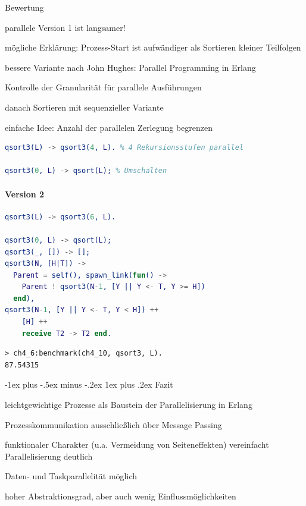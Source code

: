 \documentclass[10pt]{article}
\makeatletter
\renewcommand{\subsubsection}{\@startsection{subsubsection}{3}{0mm}%
                                {-1ex plus -.5ex minus -.2ex}%
                                {1ex plus .2ex}%
                                {\normalfont\small\bfseries}}
\makeatother
\begin{document}
Bewertung
\begin{itemize*}
  \item parallele Version 1 ist langsamer!
  \item mögliche Erklärung: Prozess-Start ist aufwändiger als Sortieren kleiner Teilfolgen
  \item bessere Variante nach John Hughes: Parallel Programming in Erlang
  \begin{itemize*}
    \item Kontrolle der Granularität für parallele Ausführungen
    \item danach Sortieren mit sequenzieller Variante
    \item einfache Idee: Anzahl der parallelen Zerlegung begrenzen
  \end{itemize*}
\end{itemize*}
\begin{lstlisting}[language=erlang]
qsort3(L) -> qsort3(4, L). % 4 Rekursionsstufen parallel

qsort3(0, L) -> qsort(L); % Umschalten
\end{lstlisting}

\paragraph{Version 2}
\begin{lstlisting}[language=erlang]
qsort3(L) -> qsort3(6, L).

qsort3(0, L) -> qsort(L);
qsort3(_, []) -> [];
qsort3(N, [H|T]) ->
  Parent = self(), spawn_link(fun() ->
    Parent ! qsort3(N-1, [Y || Y <- T, Y >= H])
  end),
qsort3(N-1, [Y || Y <- T, Y < H]) ++
    [H] ++
    receive T2 -> T2 end.  
\end{lstlisting}
\begin{lstlisting}
> ch4_6:benchmark(ch4_10, qsort3, L).
87.54315
\end{lstlisting}

\subsubsection{Fazit}
\begin{itemize*}
  \item \color{orange} leichtgewichtige Prozesse \color{black} als Baustein der Parallelisierung in Erlang
  \item Prozesskommunikation ausschließlich über \color{orange} Message Passing \color{black}
  \item \color{orange} funktionaler Charakter \color{black} (u.a. Vermeidung von Seiteneffekten) vereinfacht Parallelisierung deutlich
  \item \color{orange} Daten- und Taskparallelität \color{black} möglich
  \item hoher Abstraktionsgrad, aber auch wenig Einflussmöglichkeiten
\end{itemize*}
\end{document}

